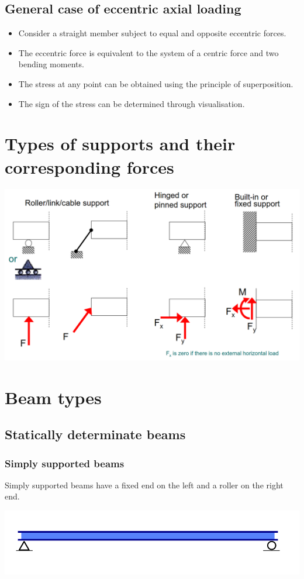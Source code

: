 \documentclass[11pt]{article}
\begin{document}
\subsection{General case of eccentric axial loading}
\label{sec:org9fe94b3}
\begin{itemize}
\item Consider a straight member subject to equal and opposite eccentric forces.
\item The eccentric force is equivalent to the system of a centric force and two bending moments.
\item The stress at any point can be obtained using the principle of superposition.
\item The sign of the stress can be determined through visualisation.
\end{itemize}

\newpage
\section{Types of supports and their corresponding forces}
\label{sec:org685fca8}
\begin{center}
\includegraphics[width=.9\linewidth]{./images/types-of-supports.png}
\end{center}
\section{Beam types}
\label{sec:org84a70e9}

\subsection{Statically determinate beams}
\label{sec:org0b30db6}

\subsubsection{Simply supported beams}
\label{sec:orge9e43d2}
Simply supported beams have a fixed end on the left and a roller on the right end.
\begin{center}
\includegraphics[width=.9\linewidth]{./images/simply-supported-beam-type.png}
\end{center}
\end{document}
